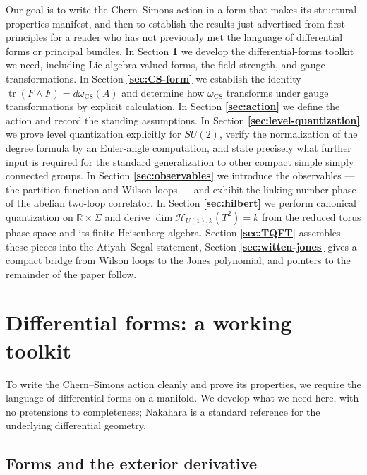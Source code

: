 \documentclass[11pt]{article}
\newcommand{\R}{\mathbb{R}}
\newcommand{\tr}{\operatorname{tr}}
\newcommand{\CS}{\operatorname{CS}}
\theoremstyle{definition}
\numberwithin{theorem}{section}
\numberwithin{equation}{section}
\begin{document}
\medskip

\noindent Our goal is to write the Chern--Simons action in a form that makes its structural properties manifest, and then to establish the results just advertised from first principles for a reader who has not previously met the language of differential forms or principal bundles. In Section \textbf{\ref{sec:forms}} we develop the differential-forms toolkit we need, including Lie-algebra-valued forms, the field strength, and gauge transformations. In Section \textbf{\ref{sec:CS-form}} we establish the identity $\tr(F\wedge F) = d\omega_{\CS}(A)$ and determine how $\omega_{\CS}$ transforms under gauge transformations by explicit calculation. In Section \textbf{\ref{sec:action}} we define the action and record the standing assumptions. In Section \textbf{\ref{sec:level-quantization}} we prove level quantization explicitly for $SU(2)$, verify the normalization of the degree formula by an Euler-angle computation, and state precisely what further input is required for the standard generalization to other compact simple simply connected groups. In Section \textbf{\ref{sec:observables}} we introduce the observables --- the partition function and Wilson loops --- and exhibit the linking-number phase of the abelian two-loop correlator. In Section \textbf{\ref{sec:hilbert}} we perform canonical quantization on $\R\times \Sigma$ and derive $\dim \mathcal{H}_{U(1),k}(T^2) = k$ from the reduced torus phase space and its finite Heisenberg algebra. Section \textbf{\ref{sec:TQFT}} assembles these pieces into the Atiyah--Segal statement, Section \textbf{\ref{sec:witten-jones}} gives a compact bridge from Wilson loops to the Jones polynomial, and pointers to the remainder of the paper follow.

\section{Differential forms: a working toolkit}\label{sec:forms}

To write the Chern--Simons action cleanly and prove its properties, we require the language of differential forms on a manifold. We develop what we need here, with no pretensions to completeness; Nakahara \cite{Nakahara2003GTP} is a standard reference for the underlying differential geometry.

\subsection{Forms and the exterior derivative}
\end{document}
